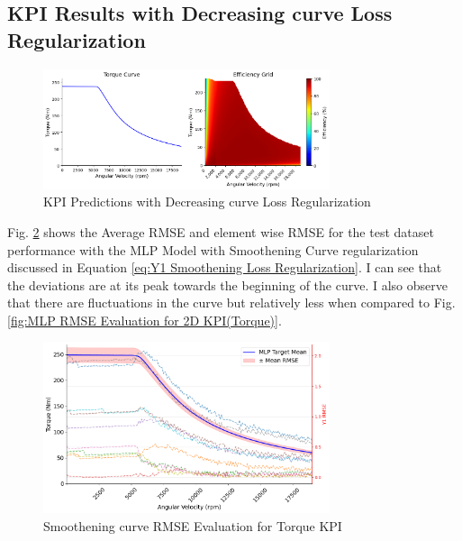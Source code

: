 \documentclass{report} %
\begin{document}
\subsection{KPI Results with Decreasing curve Loss Regularization}\label{subsec:KPI Results with Decreasing curve Loss Regularization}

\begin{figure}[H]
    \centering
    \includegraphics[width=0.75\textwidth]{./ReportImages/predictions_Decreasing.png} 
    \caption{KPI Predictions with Decreasing curve Loss Regularization} 
    \label{KPI Predictions with Decreasing curve Loss Regularization}
\end{figure}

Fig. \ref{fig:Smoothening Torque RMSE Evaluation for 2D KPI(Torque)} shows the Average \ac{RMSE} and element wise \ac{RMSE} for the test dataset performance 
with the MLP Model with Smoothening Curve regularization discussed in Equation \ref{eq:Y1 Smoothening Loss Regularization}.
I can see that the deviations are at its peak towards the beginning of the curve. 
I also observe that there are fluctuations in the curve but relatively less when compared to Fig. \ref{fig:MLP RMSE Evaluation for 2D KPI(Torque)}.
\begin{figure}[H]
    \centering
    \includegraphics[width=0.75\textwidth]{./ReportImages/RMSE_MLP_Decreasing_y1.png} 
    \caption{Smoothening curve \ac{RMSE} Evaluation for Torque \ac{KPI}} 
    \label{fig:Smoothening Torque RMSE Evaluation for 2D KPI(Torque)}
\end{figure}
\end{document}
